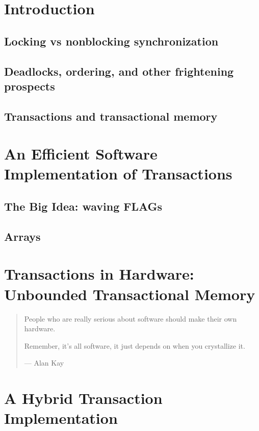 \documentclass{phd-thesis}
\author{C. Scott Ananian}
\title{\subtitle}
\date{\subdate \\ $ $Revision: 1.4 $ $}
\begin{document}

\frontmatter


\mainmatter
\chapter{Introduction}
\section{Locking vs nonblocking synchronization}
\section{Deadlocks, ordering, and other frightening prospects}
\section{Transactions and transactional memory}


\chapter{An Efficient Software Implementation of Transactions}
\section{The Big Idea: waving FLAGs}
\section{Arrays}


\chapter{Transactions in Hardware: Unbounded Transactional Memory}
\begin{quote}
People who are really serious about software should make their own hardware.

Remember, it's all software, it just depends on when you crystallize
it. 

 --- Alan Kay

\end{quote}


\chapter{A Hybrid Transaction Implementation}
\end{document}
